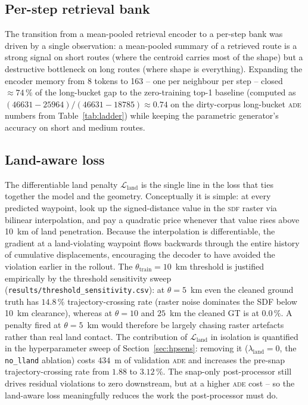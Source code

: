 \documentclass[oneside, a4paper, onecolumn, 11pt]{article}
\newcommand{\ade}{\textsc{ade}}
\newcommand{\sdf}{\textsc{sdf}}
\begin{document}
\subsection{Per-step retrieval bank}

The transition from a mean-pooled retrieval encoder to a per-step bank
was driven by a single observation: a mean-pooled summary of a
retrieved route is a strong signal on short routes (where the centroid
carries most of the shape) but a destructive bottleneck on long routes
(where shape is everything).  Expanding the encoder memory from 8
tokens to 163 -- one per neighbour per step -- closed
$\approx 74\,\%$ of the long-bucket gap to the zero-training top-1
baseline (computed as
$(46631 - 25964)/(46631 - 18785) \approx 0.74$ on the dirty-corpus
long-bucket \ade{} numbers from Table~\ref{tab:ladder}) while keeping
the parametric generator's accuracy on short and medium routes.

\subsection{Land-aware loss}\label{sec:landloss}

The differentiable land penalty $\mathcal{L}_{\mathrm{land}}$ is the
single line in the loss that ties together the model and the geometry.
Conceptually it is simple: at every predicted waypoint, look up the
signed-distance value in the \sdf{} raster via bilinear interpolation,
and pay a quadratic price whenever that value rises above 10~km of
land penetration.  Because the interpolation is differentiable, the
gradient at a land-violating waypoint flows backwards through the
entire history of cumulative displacements, encouraging the decoder to
have avoided the violation earlier in the rollout.  The
$\theta_{\mathrm{train}} = 10$~km threshold is justified empirically
by the threshold sensitivity sweep
(\texttt{results/threshold\_sensitivity.csv}): at $\theta = 5$~km even
the cleaned ground truth has $14.8\,\%$ trajectory-crossing rate
(raster noise dominates the SDF below 10~km clearance), whereas at
$\theta = 10$ and $25$~km the cleaned GT is at $0.0\,\%$. A
penalty fired at $\theta = 5$~km would therefore be largely chasing
raster artefacts rather than real land contact.
The contribution of $\mathcal{L}_{\mathrm{land}}$ in isolation is
quantified in the hyperparameter sweep of Section~\ref{sec:hpsens}:
removing it ($\lambda_{\mathrm{land}} = 0$, the \texttt{no\_lland}
ablation) costs $434$~m of validation \ade{} and increases the
pre-snap trajectory-crossing rate from $1.88$ to $3.12\,\%$.  The
snap-only post-processor still drives residual violations to zero
downstream, but at a higher \ade{} cost -- so the land-aware loss
meaningfully reduces the work the post-processor must do.
\end{document}
